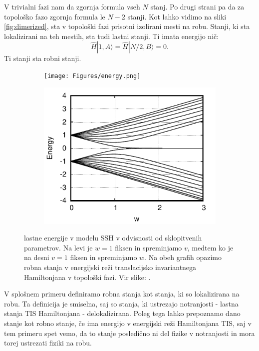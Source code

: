 V trivialni fazi nam da zgornja formula vseh $N$ stanj.  Po drugi strani pa da za topološko fazo zgornja formula le $N-2$ stanji. Kot lahko vidimo na sliki \ref{fig:dimerized}, sta v topološki fazi prisotni izolirani mesti na robu. Stanji, ki sta lokalizirani na teh mestih, sta tudi lastni stanji. Ti imata energijo nič:
\begin{equation}
\hat{H} |1, A \rangle = \hat{H} | N/2, B \rangle = 0.
\end{equation}
Ti stanji sta robni stanji.
\begin{figure}[!h]
\centering
\begin{subfigure}{.48\textwidth}
\texttt{[image: Figures/energy.png]}
\end{subfigure}
\begin{subfigure}{.48\textwidth}
\includegraphics[width=\linewidth]{Figures/energy2.pdf}
\end{subfigure}
\caption{lastne energije v modelu SSH v odvisnosti od sklopitvenih parametrov. Na levi je $w=1$ fiksen in spreminjamo $v$, medtem ko je na desni $v=1$ fiksen in spreminjamo $w$. Na obeh grafih opazimo robna stanja v energijski reži translacijsko invariantnega Hamiltonjana v topološki fazi. Vir slike: \cite{arxiv}.}
\label{fig:movingaway}
\end{figure}
V splošnem primeru definiramo robna stanja kot stanja, ki so lokalizirana na robu. Ta definicija je smiselna, saj so stanja, ki ustrezajo notranjosti - lastna stanja TIS Hamiltonjana - delokalizirana. Poleg tega lahko prepoznamo dano stanje kot robno stanje, če ima energijo v energijski reži Hamiltonjana TIS, saj v tem primeru spet vemo, da to stanje posledično ni del fizike v notranjosti in mora torej ustrezati fiziki na robu.
